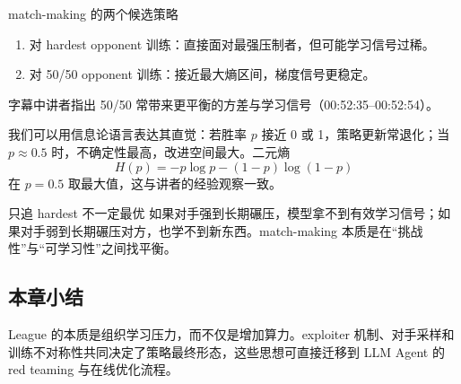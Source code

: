 \begin{knowledgebox}{match-making 的两个候选策略}
\begin{enumerate}
    \item 对 hardest opponent 训练：直接面对最强压制者，但可能学习信号过稀。
    \item 对 50/50 opponent 训练：接近最大熵区间，梯度信号更稳定。
\end{enumerate}
字幕中讲者指出 50/50 常带来更平衡的方差与学习信号（00:52:35--00:52:54）。
\end{knowledgebox}

我们可以用信息论语言表达其直觉：若胜率 $p$ 接近 0 或 1，策略更新常退化；当 $p\approx0.5$ 时，不确定性最高，改进空间最大。二元熵
\[
H(p)=-p\log p-(1-p)\log(1-p)
\]
在 $p=0.5$ 取最大值，这与讲者的经验观察一致。

\begin{warningbox}{只追 hardest 不一定最优}
如果对手强到长期碾压，模型拿不到有效学习信号；如果对手弱到长期碾压对方，也学不到新东西。match-making 本质是在``挑战性''与``可学习性''之间找平衡。
\end{warningbox}

\subsection{本章小结}
League 的本质是组织学习压力，而不仅是增加算力。exploiter 机制、对手采样和训练不对称性共同决定了策略最终形态，这些思想可直接迁移到 LLM Agent 的 red teaming 与在线优化流程。

